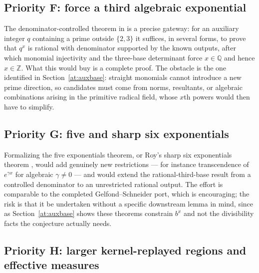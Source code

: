 \documentclass[11pt,oneside]{article}
\theoremstyle{definition}
\theoremstyle{remark}
\newcommand{\Z}{\mathbb Z}
\newcommand{\Q}{\mathbb Q}
\newcommand{\lean}[1]{\texttt{\detokenize{#1}}}
\begin{document}
\subsection{Priority F: force a third algebraic exponential}
\label{at:prog-thirdbase}

The denominator-controlled theorem in \lean{RationalThirdBase} is a precise gateway: for an
auxiliary integer $q$ containing a prime outside $\{2,3\}$ it suffices, in several forms, to
prove that $q^{x}$ is rational with denominator supported by the known outputs, after which
monomial injectivity and the three-base determinant force $x\in\Q$ and hence $x\in\Z$.  What
this would buy is a complete proof.  The obstacle is the one identified in
Section~\ref{at:auxbase}: straight monomials cannot introduce a new prime direction, so
candidates must come from norms, resultants, or algebraic combinations arising in the
primitive radical field, whose $x$th powers would then have to simplify.

\subsection{Priority G: five and sharp six exponentials}
\label{at:prog-fiveexp}

Formalizing the five exponentials theorem, or Roy's sharp six exponentials theorem
\cite{Roy1992}, would add genuinely new restrictions --- for instance transcendence of
$e^{\gamma x}$ for algebraic $\gamma\ne0$ --- and would extend the rational-third-base
result from a controlled denominator to an unrestricted rational output.  The effort is
comparable to the completed Gelfond--Schneider port, which is encouraging; the risk is that
it be undertaken without a specific downstream lemma in mind, since as
Section~\ref{at:auxbase} shows these theorems constrain $b^{x}$ and not the divisibility
facts the conjecture actually needs.

\subsection{Priority H: larger kernel-replayed regions and effective measures}
\label{at:prog-finite}
\end{document}
